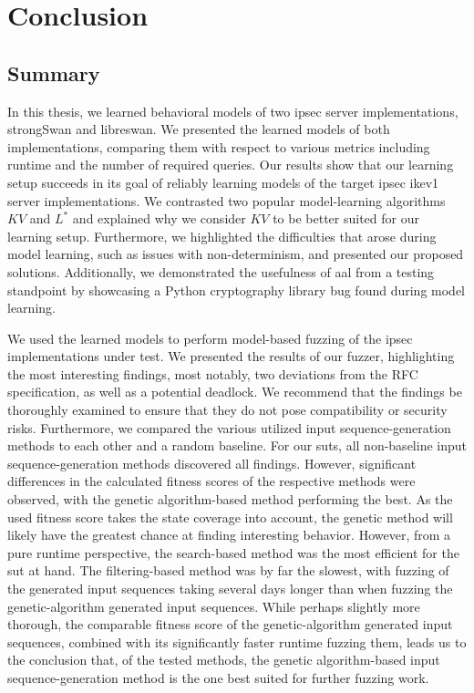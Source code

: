 \chapter{Conclusion} \label{chap:Conclusion}

\section{Summary}
In this thesis, we learned behavioral models of two \ac{ipsec} server implementations, strongSwan and libreswan. We presented the learned models of both implementations, comparing them with respect to various metrics including runtime and the number of required queries. Our results show that our learning setup succeeds in its goal of reliably learning models of the target \ac{ipsec} \ac{ike}v1 server implementations. We contrasted two popular model-learning algorithms $KV$ and $L^*$ and explained why we consider $KV$ to be better suited for our learning setup. Furthermore, we highlighted the difficulties that arose during model learning, such as issues with non-determinism, and presented our proposed solutions. Additionally, we demonstrated the usefulness of \ac{aal} from a testing standpoint by showcasing a Python cryptography library bug found during model learning. 

We used the learned models to perform model-based fuzzing of the \ac{ipsec} implementations under test. We presented the results of our fuzzer, highlighting the most interesting findings, most notably, two deviations from the RFC specification, as well as a potential deadlock. We recommend that the findings be thoroughly examined to ensure that they do not pose compatibility or security risks. Furthermore, we compared the various utilized input sequence-generation methods to each other and a random baseline. For our \acp{sut}, all non-baseline input sequence-generation methods discovered all findings. However, significant differences in the calculated fitness scores of the respective methods were observed, with the genetic algorithm-based method performing the best. As the used fitness score takes the state coverage into account, the genetic method will likely have the greatest chance at finding interesting behavior. However, from a pure runtime perspective, the search-based method was the most efficient for the \ac{sut} at hand. The filtering-based method was by far the slowest, with fuzzing of the generated input sequences taking several days longer than when fuzzing the genetic-algorithm generated input sequences. While perhaps slightly more thorough, the comparable fitness score of the genetic-algorithm generated input sequences, combined with its significantly faster runtime fuzzing them, leads us to the conclusion that, of the tested methods, the genetic algorithm-based input sequence-generation method is the one best suited for further fuzzing work.

